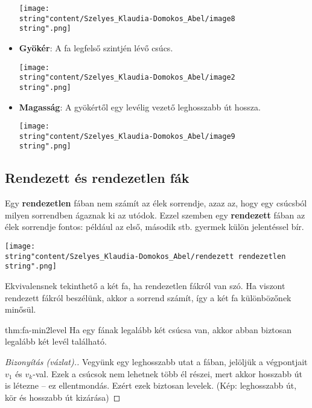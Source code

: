 \begin{itemize}
\begin{center}
		\texttt{[image: \\string"content/Szelyes\_Klaudia-Domokos\_Abel/image8\\string".png]}
		\par\end{center}
	\item \textbf{Gyökér}: A fa legfelső szintjén lévő csúcs.
	\begin{center}
		\texttt{[image: \\string"content/Szelyes\_Klaudia-Domokos\_Abel/image2\\string".png]}
		\par\end{center}
	\item \textbf{Magasság}: A gyökértől egy levélig vezető leghosszabb út hossza.
	\begin{center}
		\texttt{[image: \\string"content/Szelyes\_Klaudia-Domokos\_Abel/image9\\string".png]}
		\par\end{center}
\end{itemize}

\subsection*{Rendezett és rendezetlen fák}

Egy \textbf{rendezetlen} fában nem számít az élek sorrendje, azaz
az, hogy egy csúcsból milyen sorrendben ágaznak ki az utódok. Ezzel
szemben egy \textbf{rendezett} fában az élek sorrendje fontos: például
az első, második stb. gyermek külön jelentéssel bír. 
\begin{center}
\texttt{[image: \\string"content/Szelyes\_Klaudia-Domokos\_Abel/rendezett rendezetlen\\string".png]}
\par\end{center}
Ekvivalensnek tekinthető a két fa, ha rendezetlen fákról van szó.
Ha viszont rendezett fákról beszélünk, akkor a sorrend számít, így
a két fa különbözőnek minősül.

\begin{theorem}{thm:fa-min2level}
Ha egy fának legalább két csúcsa van, akkor abban biztosan legalább
két levél található.
\end{theorem}
\begin{proof}[Bizonyítás (vázlat).]
Vegyünk egy leghosszabb utat a fában,
jelöljük a végpontjait $v_{1}$ és $v_{k}$-val. Ezek a csúcsok nem
lehetnek több él részei, mert akkor hosszabb út is létezne -- ez
ellentmondás. Ezért ezek biztosan levelek. (Kép: leghosszabb út, kör
és hosszabb út kizárása)
\end{proof}

